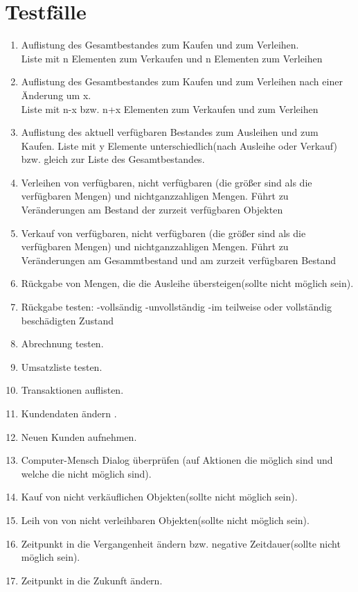 \documentclass[a4paper,12pt,titlepage]{article}
\begin{document}
\part{Testfälle}
\begin{enumerate}
\item
Auflistung des Gesamtbestandes zum Kaufen und zum Verleihen.\\
\Rightarrow Liste mit n Elementen zum Verkaufen und n Elementen zum Verleihen
\item
Auflistung des Gesamtbestandes zum Kaufen und zum Verleihen nach einer Änderung um x.\\
\Rightarrow Liste mit n-x bzw. n+x Elementen zum Verkaufen und zum Verleihen
\item
Auflistung des aktuell verfügbaren Bestandes zum Ausleihen und zum Kaufen.
\Rightarrow Liste mit y Elemente unterschiedlich(nach Ausleihe oder Verkauf) bzw. gleich zur Liste des Gesamtbestandes. 
\item
Verleihen von verfügbaren, nicht verfügbaren (die größer sind als die verfügbaren Mengen) und nichtganzzahligen Mengen.
\Rightarrow Führt zu Veränderungen am Bestand der zurzeit verfügbaren Objekten 
\item
Verkauf von verfügbaren, nicht verfügbaren (die größer sind als die verfügbaren Mengen) und nichtganzzahligen Mengen.
\Rightarrow Führt zu Veränderungen am Gesammtbestand und am zurzeit verfügbaren Bestand
\item
Rückgabe von Mengen, die die Ausleihe übersteigen(sollte nicht möglich sein).
\item
Rückgabe testen:
-vollsändig
-unvollständig
-im teilweise oder vollständig beschädigten Zustand
\item
Abrechnung testen.
\item
Umsatzliste testen.
\item
Transaktionen auflisten.
\item
Kundendaten ändern .
\item
Neuen Kunden aufnehmen.
\item
Computer-Mensch Dialog überprüfen (auf Aktionen die möglich sind und welche die nicht möglich sind).
\item
Kauf von nicht verkäuflichen Objekten(sollte nicht möglich sein).
\item
Leih von von nicht verleihbaren Objekten(sollte nicht möglich sein).
\item
Zeitpunkt in die Vergangenheit ändern bzw. negative Zeitdauer(sollte nicht möglich sein).
\item
Zeitpunkt in die Zukunft ändern.

\end{enumerate}
\appendix
\newpage
\end{document}
